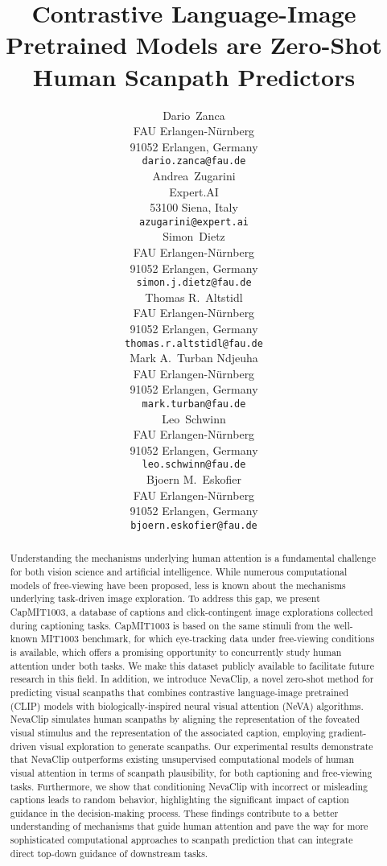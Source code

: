 \documentclass{article}
\title{Contrastive Language-Image Pretrained Models are Zero-Shot Human Scanpath Predictors}
\author{Dario~Zanca\\
  FAU Erlangen-N\"urnberg\\
  91052 Erlangen, Germany \\
  \texttt{dario.zanca@fau.de} \\
  \And
  Andrea~Zugarini\\
  Expert.AI\\
  53100 Siena, Italy \\
  \texttt{azugarini@expert.ai} \\
  \And
  Simon~Dietz\\
  FAU Erlangen-N\"urnberg\\
  91052 Erlangen, Germany \\
  \texttt{simon.j.dietz@fau.de} \\
  \And
  Thomas R.~Altstidl\\
  FAU Erlangen-N\"urnberg\\
  91052 Erlangen, Germany \\
  \texttt{thomas.r.altstidl@fau.de} \\
  \And
  Mark A.~Turban Ndjeuha\\
  FAU Erlangen-N\"urnberg\\
  91052 Erlangen, Germany \\
  \texttt{mark.turban@fau.de} \\
  \And
  Leo~Schwinn\\
  FAU Erlangen-N\"urnberg\\
  91052 Erlangen, Germany \\
  \texttt{leo.schwinn@fau.de} \\
  \And
  Bjoern M.~Eskofier\\
  FAU Erlangen-N\"urnberg\\
  91052 Erlangen, Germany \\
  \texttt{bjoern.eskofier@fau.de} \\
  }
\begin{document}
\maketitle


\begin{abstract}
Understanding the mechanisms underlying human attention is a fundamental challenge for both vision science and artificial intelligence. While numerous computational models of free-viewing have been proposed, less is known about the mechanisms underlying task-driven image exploration. 
To address this gap, we present CapMIT1003, a database of captions and click-contingent image explorations collected during captioning tasks. CapMIT1003 is based on the same stimuli from the well-known MIT1003 benchmark, for which eye-tracking data under free-viewing conditions is available, which offers a promising opportunity to concurrently study human attention under both tasks. We make this dataset publicly available to facilitate future research in this field. 
In addition, we introduce NevaClip, a novel zero-shot method for predicting visual scanpaths that combines contrastive language-image pretrained (CLIP) models with biologically-inspired neural visual attention (NeVA) algorithms. NevaClip simulates human scanpaths by aligning the representation of the foveated visual stimulus and the representation of the associated caption, employing gradient-driven visual exploration to generate scanpaths.
Our experimental results demonstrate that NevaClip outperforms existing unsupervised computational models of human visual attention in terms of scanpath plausibility, for both captioning and free-viewing tasks. Furthermore, we show that conditioning NevaClip with incorrect or misleading captions leads to random behavior, highlighting the significant impact of caption guidance in the decision-making process. These findings contribute to a better understanding of mechanisms that guide human attention and pave the way for more sophisticated computational approaches to scanpath prediction that can integrate direct top-down guidance of downstream tasks. 
\end{abstract}
\end{document}
